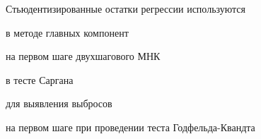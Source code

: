 
\begin{question}
Стьюдентизированные остатки регрессии используются
\begin{answerlist}
  \item в методе главных компонент
  \item на первом шаге двухшагового МНК
  \item в тесте Саргана
  \item для выявления выбросов
  \item на первом шаге при проведении теста Годфельда-Квандта
\end{answerlist}
\end{question}


